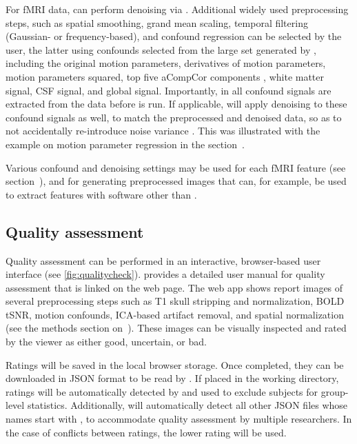 For fMRI data,  can perform denoising via 
\parencite{10.1016/j.neuroimage.2015.02.064}. Additional widely used
preprocessing steps, such as spatial smoothing, grand mean scaling,
temporal filtering (Gaussian- or frequency-based), and confound regression
can be selected by the user, the latter using confounds selected from the
large set generated by , including the original motion
parameters, derivatives of motion parameters, motion parameters squared,
top five aCompCor components \parencite{10.1016/j.neuroimage.2007.04.042},
white matter signal, CSF signal, and global signal. Importantly, in
 all confound signals are extracted from the data before
 is run. If applicable,  will apply
denoising to these confound signals as well, to match the preprocessed and
denoised data, so as to not accidentally re-introduce noise variance
\parencite{10.1016/j.neuroimage.2013.05.116,10.1002/hbm.24528}. This was
illustrated with the example on motion parameter regression in the
section~.

Various confound and denoising settings may be used for each fMRI feature
(see section~), and for generating
preprocessed images that can, for example, be used to extract features with
software other than .

\subsection{Quality assessment}

Quality assessment can be performed in an interactive, browser-based user
interface (see \autoref{fig:qualitycheck}).  provides a
detailed user manual for quality assessment that is linked on the web page.
The web app shows report images of several preprocessing steps such as T1
skull stripping and normalization, BOLD tSNR, motion confounds, ICA-based
artifact removal, and spatial normalization (see the methods section
on~). These images can be visually inspected and
rated by the viewer as either good, uncertain, or bad.

Ratings will be saved in the local browser storage. Once completed, they
can be downloaded in JSON format to be read by . If placed
in the working directory, ratings will be automatically detected by
 and used to exclude subjects for group-level statistics.
Additionally,  will automatically detect all other JSON
files whose names start with , to accommodate quality
assessment by multiple researchers. In the case of conflicts between
ratings, the lower rating will be used.


